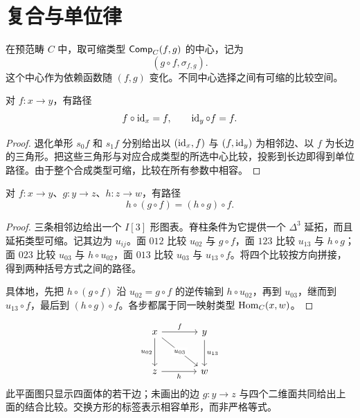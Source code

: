 \section{复合与单位律}
\begin{definition}[选定的复合]
在预范畴 $C$ 中，取可缩类型 $\mathsf{Comp}_C(f,g)$ 的中心，记为
\[
(g\circ f,\sigma_{f,g}).
\]
这个中心作为依赖函数随 $(f,g)$ 变化。不同中心选择之间有可缩的比较空间。
\end{definition}
\begin{proposition}[单位律]
对 $f:x\to y$，有路径
\[
f\circ\operatorname{id}_x=f,
\qquad \operatorname{id}_y\circ f=f.
\]
\end{proposition}
\begin{proof}
退化单形 $s_0f$ 和 $s_1f$ 分别给出以 $(\operatorname{id}_x,f)$ 与 $(f,\operatorname{id}_y)$ 为相邻边、以 $f$ 为长边的三角形。把这些三角形与对应合成类型的所选中心比较，投影到长边即得到单位路径。由于整个合成类型可缩，比较在所有参数中相容。
\end{proof}
\begin{proposition}[结合律]
对 $f:x\to y$、$g:y\to z$、$h:z\to w$，有路径
\[
h\circ(g\circ f)=(h\circ g)\circ f.
\]
\end{proposition}
\begin{proof}
三条相邻边给出一个 $I[3]$ 形图表。脊柱条件为它提供一个 $\Delta^3$ 延拓，而且延拓类型可缩。记其边为 $u_{ij}$。面 $012$ 比较 $u_{02}$ 与 $g\circ f$，面 $123$ 比较 $u_{13}$ 与 $h\circ g$；面 $023$ 比较 $u_{03}$ 与 $h\circ u_{02}$，面 $013$ 比较 $u_{03}$ 与 $u_{13}\circ f$。将四个比较按方向拼接，得到两种括号方式之间的路径。

具体地，先把 $h\circ(g\circ f)$ 沿 $u_{02}=g\circ f$ 的逆传输到 $h\circ u_{02}$，再到 $u_{03}$，继而到 $u_{13}\circ f$，最后到 $(h\circ g)\circ f$。各步都属于同一映射类型 $\operatorname{Hom}_C(x,w)$。
\end{proof}
\begin{example}[四面体中的比较]
\[
\begin{tikzcd}[row sep=large,column sep=large]
x\ar[r,"f"]\ar[d,"u_{02}"']\ar[dr,"u_{03}" description]&y\ar[d,"u_{13}"]\\
z\ar[r,"h"']&w
\end{tikzcd}
\]
此平面图只显示四面体的若干边；未画出的边 $g:y\to z$ 与四个二维面共同给出上面的结合比较。交换方形的标签表示相容单形，而非严格等式。
\end{example}

